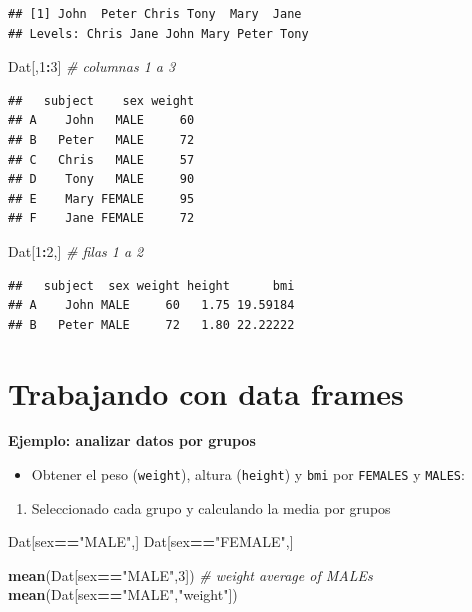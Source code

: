 \documentclass[]{book}
\newenvironment{Shaded}{\begin{snugshade}}{\end{snugshade}}
\newcommand{\KeywordTok}[1]{\textcolor[rgb]{0.13,0.29,0.53}{\textbf{#1}}}
\newcommand{\DecValTok}[1]{\textcolor[rgb]{0.00,0.00,0.81}{#1}}
\newcommand{\StringTok}[1]{\textcolor[rgb]{0.31,0.60,0.02}{#1}}
\newcommand{\CommentTok}[1]{\textcolor[rgb]{0.56,0.35,0.01}{\textit{#1}}}
\newcommand{\OperatorTok}[1]{\textcolor[rgb]{0.81,0.36,0.00}{\textbf{#1}}}
\newcommand{\NormalTok}[1]{#1}
\providecommand{\tightlist}{%
  \setlength{\itemsep}{0pt}\setlength{\parskip}{0pt}}
\begin{document}
\begin{verbatim}
## [1] John  Peter Chris Tony  Mary  Jane 
## Levels: Chris Jane John Mary Peter Tony
\end{verbatim}

\begin{Shaded}
\begin{Highlighting}[]
\NormalTok{Dat[,}\DecValTok{1}\OperatorTok{:}\DecValTok{3}\NormalTok{]   }\CommentTok{# columnas 1 a 3}
\end{Highlighting}
\end{Shaded}

\begin{verbatim}
##   subject    sex weight
## A    John   MALE     60
## B   Peter   MALE     72
## C   Chris   MALE     57
## D    Tony   MALE     90
## E    Mary FEMALE     95
## F    Jane FEMALE     72
\end{verbatim}

\begin{Shaded}
\begin{Highlighting}[]
\NormalTok{Dat[}\DecValTok{1}\OperatorTok{:}\DecValTok{2}\NormalTok{,]   }\CommentTok{# filas 1 a 2}
\end{Highlighting}
\end{Shaded}

\begin{verbatim}
##   subject  sex weight height      bmi
## A    John MALE     60   1.75 19.59184
## B   Peter MALE     72   1.80 22.22222
\end{verbatim}

\section{Trabajando con data frames}\label{trabajando-con-data-frames}

\textbf{Ejemplo: analizar datos por grupos}

\begin{itemize}
\tightlist
\item
  Obtener el peso (\texttt{weight}), altura (\texttt{height}) y
  \texttt{bmi} por \texttt{FEMALES} y \texttt{MALES}:
\end{itemize}

\begin{enumerate}
\def\labelenumi{\arabic{enumi}.}
\tightlist
\item
  Seleccionado cada grupo y calculando la media por grupos
\end{enumerate}

\begin{Shaded}
\begin{Highlighting}[]
\NormalTok{Dat[sex}\OperatorTok{==}\StringTok{"MALE"}\NormalTok{,]}
\NormalTok{Dat[sex}\OperatorTok{==}\StringTok{"FEMALE"}\NormalTok{,]}

\KeywordTok{mean}\NormalTok{(Dat[sex}\OperatorTok{==}\StringTok{"MALE"}\NormalTok{,}\DecValTok{3}\NormalTok{])  }\CommentTok{# weight average of MALEs}
\KeywordTok{mean}\NormalTok{(Dat[sex}\OperatorTok{==}\StringTok{"MALE"}\NormalTok{,}\StringTok{"weight"}\NormalTok{])}
\end{Highlighting}
\end{Shaded}
\end{document}
